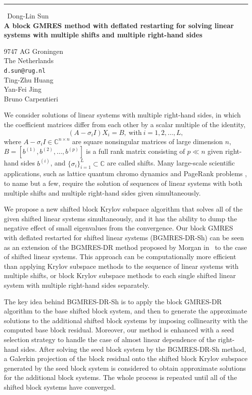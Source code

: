 \documentclass{report}
\begin{document}
\begin{center}
\rule{6in}{1pt} \
{\large Dong-Lin Sun \\
{\bf A block GMRES method with deflated restarting for solving linear systems with multiple shifts and multiple right-hand sides}}

9747 AG Groningen \\ The Netherlands
\\
{\tt d.sun@rug.nl}\\
Ting-Zhu Huang\\
Yan-Fei Jing\\
Bruno Carpentieri\end{center}

We consider solutions of linear systems with multiple right-hand sides,
in which the coefficient matrices differ from each other by a scalar
multiple of the identity,
\begin{equation}\label{ABL}
(A-\sigma_{i}I)X_{i} = B,~\text{with} ~i = 1, 2, \ldots, L,
\end{equation}
where $A-\sigma_{i}I \in \mathbb C^{n\times n}$ are square nonsingular
matrices of large dimension $n$, $B = [b^{(1)}, b^{(2)},\ldots, b^{(p)}]$
is a full rank matrix consisting of $p\ll n$ given right-hand sides
$b^{(i)}$, and $\{\sigma _{i}\}_{i = 1}^{L}\subset \mathbb C$ are called
shifts. Many large-scale scientific applications, such as lattice quantum
chromo dynamics \cite{frommer1995} and PageRank problems
\cite{haveliwala2003topic}, to name but a few, require the solution of
sequences of linear systems with both multiple shifts and multiple
right-hand sides given simultaneously.

We propose a new shifted block Krylov subspace algorithm that solves all
of the given shifted linear systems simultaneously, and it has the
ability to dump the negative effect of small eigenvalues from the
convergence. Our block GMRES with deflated restarted for shifted linear
systems (BGMRES-DR-Sh) can be seen as an extension of the BGMRES-DR
method proposed by Morgan in~\cite{Morgan2005} to the case of shifted
linear systems.
This approach can be computationally more efficient than applying Krylov
subspace methods to the sequence of linear systems with multiple
shifts, or block Krylov subspace methods to each single shifted linear
system with multiple right-hand sides separately.

The key idea behind BGMRES-DR-Sh is to apply the block GMRES-DR algorithm
to the base shifted block system, and then to generate the approximate
solutions to the additional shifted block systems by imposing
collinearity with the computed base block residual. Moreover, our method
is enhanced with a seed selection strategy to handle the case of almost
linear dependence of the right-hand sides. After solving the seed block
system by the BGMRES-DR-Sh method, a Galerkin projection of the block
residual onto the shifted block Krylov subspace generated by the seed
block system is considered to obtain approximate solutions for the
additional block systems. The whole process is repeated until all of the
shifted block systems have converged.
\end{document}
